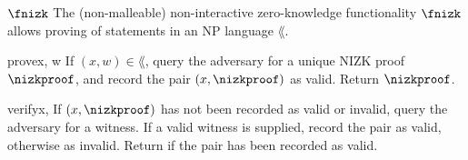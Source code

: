 \begin{functionalitysketch}{$\fnizk$}
  The (non-malleable) non-interactive zero-knowledge functionality
  $\fnizk$ allows proving of statements in an NP language $\lang$.

  \begin{receivesketch}{prove}{x, w}
    If $(x, w) \in \lang$, query the adversary for a unique NIZK proof
    $\nizkproof$, and record the pair $(x, \nizkproof)$ as valid. Return
    $\nizkproof$.
  \end{receivesketch}
  \begin{receivesketch}{verify}{x, \nizkproof}
    If $(x, \nizkproof)$ has not been recorded as valid or invalid, query the
    adversary for a witness. If a valid witness is supplied, record the pair as
    valid, otherwise as invalid. Return if the pair has been recorded as valid.
  \end{receivesketch}
\end{functionalitysketch}

